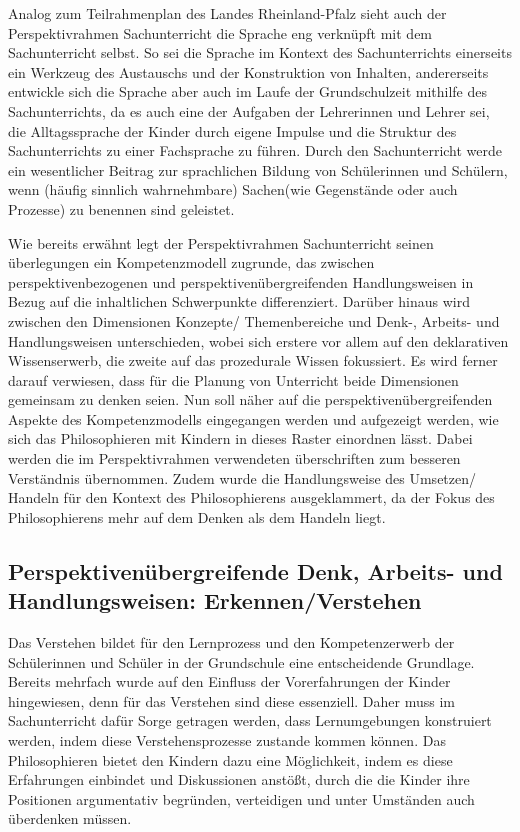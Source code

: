 Analog zum Teilrahmenplan des Landes Rheinland-Pfalz sieht auch der Perspektivrahmen Sachunterricht die Sprache eng verknüpft mit dem Sachunterricht selbst. 
So sei die Sprache im Kontext des Sachunterrichts einerseits ein Werkzeug des Austauschs und der Konstruktion von Inhalten, andererseits entwickle sich die Sprache aber auch im Laufe der Grundschulzeit mithilfe des Sachunterrichts, da es auch eine der Aufgaben der Lehrerinnen und Lehrer sei, die Alltagssprache der Kinder durch eigene Impulse und die Struktur des Sachunterrichts zu einer Fachsprache zu führen. 
Durch den Sachunterricht werde ein wesentlicher \glqq Beitrag zur sprachlichen Bildung von Schülerinnen und Schülern, wenn (häufig sinnlich wahrnehmbare) \glqq Sachen\grqq (wie Gegenstände oder auch Prozesse) zu benennen sind\grqq{}\cite[S.\,11]{GDS13} geleistet.

Wie bereits erwähnt legt der Perspektivrahmen Sachunterricht seinen überlegungen ein Kompetenzmodell zugrunde, das zwischen perspektivenbezogenen und perspektivenübergreifenden Handlungsweisen in Bezug auf die inhaltlichen Schwerpunkte differenziert.
 Darüber hinaus wird zwischen den Dimensionen \glqq Konzepte/ Themenbereiche\grqq{} und \glqq Denk-, Arbeits- und Handlungsweisen\grqq{} unterschieden, wobei sich erstere vor allem auf den deklarativen Wissenserwerb, die zweite auf das prozedurale Wissen fokussiert. 
 Es wird ferner darauf verwiesen, dass für die Planung von Unterricht beide Dimensionen gemeinsam zu denken seien.
 Nun soll näher auf die perspektivenübergreifenden Aspekte des Kompetenzmodells eingegangen werden und aufgezeigt werden, wie sich das Philosophieren mit Kindern in dieses Raster einordnen lässt. 
 Dabei werden die im Perspektivrahmen verwendeten überschriften zum besseren Verständnis übernommen. 
Zudem wurde die Handlungsweise des Umsetzen/ Handeln für den Kontext des Philosophierens ausgeklammert, da der Fokus des Philosophierens mehr auf dem Denken als dem Handeln liegt.

\newpage

\subsection{Perspektivenübergreifende Denk, Arbeits- und Handlungsweisen: Erkennen/Verstehen}


Das Verstehen bildet für den Lernprozess und den Kompetenzerwerb der Schülerinnen und Schüler in der Grundschule eine entscheidende Grundlage. 
Bereits mehrfach wurde auf den Einfluss der Vorerfahrungen der Kinder hingewiesen, denn für das Verstehen sind diese essenziell. 
Daher muss im Sachunterricht dafür Sorge getragen werden, dass Lernumgebungen konstruiert werden, indem diese Verstehensprozesse zustande kommen können. 
Das Philosophieren bietet den Kindern dazu eine Möglichkeit, indem es diese Erfahrungen einbindet und Diskussionen anstößt, durch die die Kinder ihre Positionen argumentativ begründen, verteidigen und unter Umständen auch überdenken müssen. 

